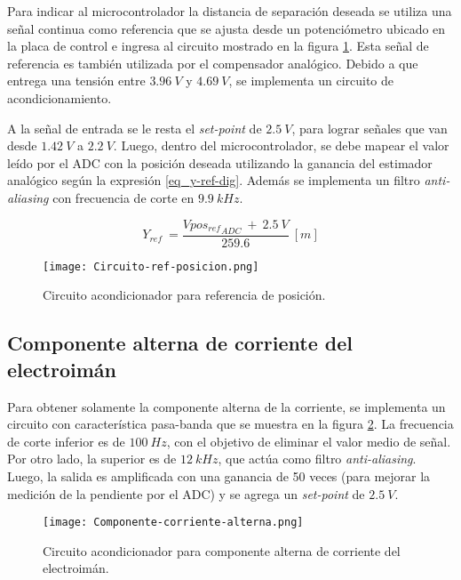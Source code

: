 \noindent Para indicar al microcontrolador la distancia de separación deseada se utiliza una señal continua como referencia que se ajusta desde un potenciómetro ubicado en la placa de control  e ingresa al circuito mostrado en la figura \ref{fig:circuito-ref-posicion}. Esta señal de referencia es también utilizada por el compensador analógico. Debido a que entrega una tensión entre $3.96\:V$ y $4.69\:V$, se implementa un circuito de acondicionamiento.

\noindent A la señal de entrada se le resta el \textsl{set-point} de $2.5\:V$, para lograr señales que van desde $1.42\:V$ a $2.2\:V$. Luego, dentro del microcontrolador, se debe mapear el valor leído por el ADC con la posición deseada utilizando la ganancia del estimador analógico según la expresión \ref{eq_y-ref-dig}. Además se implementa un filtro \textsl{anti-aliasing} con frecuencia de corte en $9.9\:kHz$.

\begin{equation} \label{eq_y-ref-dig}
	Y_{ref}\ =\frac{Vpo{s_{ref}}_{ADC}\ +\ 2.5\:V}{259.6}\:[m]
\end{equation}

\begin{figure}[H]
	\centering
	\texttt{[image: Circuito-ref-posicion.png]}
	\caption{Circuito acondicionador para referencia de posición.}
	\label{fig:circuito-ref-posicion}
\end{figure}

\subsection{Componente  alterna de corriente del electroimán}

\noindent Para obtener solamente la componente alterna de la corriente, se implementa un circuito con característica pasa-banda que se muestra en la figura \ref{fig:componente-corriente-alterna}. La frecuencia de corte inferior  es de $100\:Hz$, con el objetivo de eliminar el valor medio de señal. Por otro lado, la superior es de $12\:kHz$, que actúa como filtro \textsl{anti-aliasing}. Luego, la salida es amplificada con una ganancia de 50 veces (para mejorar la medición de la pendiente por el ADC) y se agrega un \textsl{set-point} de $2.5\:V$.

\begin{figure}[H]
	\centering
	\texttt{[image: Componente-corriente-alterna.png]}
	\caption{ Circuito acondicionador para componente alterna de corriente del electroimán.
	}
	\label{fig:componente-corriente-alterna}
\end{figure}

